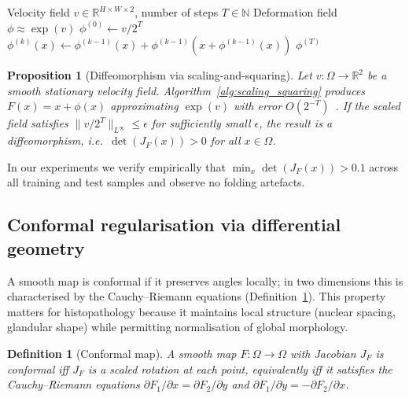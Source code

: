 \documentclass[pdflatex,sn-nature]{sn-jnl}%
\theoremstyle{thmstyleone}%
\newtheorem{proposition}[theorem]{Proposition}%
\theoremstyle{thmstyletwo}%
\theoremstyle{thmstylethree}%
\newtheorem{definition}{Definition}%
\begin{document}
\begin{algorithm}[t]
\caption{Scaling-and-Squaring for Diffeomorphic Integration}
\label{alg:scaling_squaring}
\begin{algorithmic}[1]
\REQUIRE Velocity field $v \in \mathbb{R}^{H \times W \times 2}$, number of steps $T \in \mathbb{N}$
\ENSURE Deformation field $\phi \approx \exp(v)$
\STATE $\phi^{(0)} \leftarrow v / 2^T$ \quad {}
    \STATE $\phi^{(k)}(x) \leftarrow \phi^{(k-1)}(x) + \phi^{(k-1)}(x + \phi^{(k-1)}(x))$ \quad {}
\ENDFOR
\RETURN $\phi^{(T)}$
\end{algorithmic}
\end{algorithm}


\begin{proposition}[Diffeomorphism via scaling-and-squaring]
\label{prop:diffeomorphism}
Let $v:\Omega\rightarrow\mathbb{R}^2$ be a smooth stationary velocity field.
Algorithm~\ref{alg:scaling_squaring} produces $F(x)=x+\phi(x)$ approximating
$\exp(v)$ with error $O(2^{-T})$~\cite{arsigny2006logdiff}. If the scaled field
satisfies $\|v/2^T\|_{L^\infty}\leq\epsilon$ for sufficiently small $\epsilon$,
the result is a diffeomorphism, i.e.\ $\det(J_F(x))>0$ for all $x\in\Omega$.
\end{proposition}

In our experiments we verify empirically that $\min_x\det(J_F(x))>0.1$ across all
training and test samples and observe no folding artefacts.

\subsection{Conformal regularisation via differential geometry}

A smooth map is conformal if it preserves angles locally; in two dimensions this
is characterised by the Cauchy--Riemann equations (Definition~\ref{def:conformal}).
This property matters for histopathology because it maintains local structure
(nuclear spacing, glandular shape) while permitting normalisation of global
morphology.

\begin{definition}[Conformal map]
\label{def:conformal}
A smooth map $F:\Omega\rightarrow\Omega$ with Jacobian $J_F$ is conformal iff
$J_F$ is a scaled rotation at each point, equivalently iff it satisfies the
Cauchy--Riemann equations
$\partial F_1/\partial x=\partial F_2/\partial y$ and
$\partial F_1/\partial y=-\partial F_2/\partial x$.
\end{definition}
\end{document}
